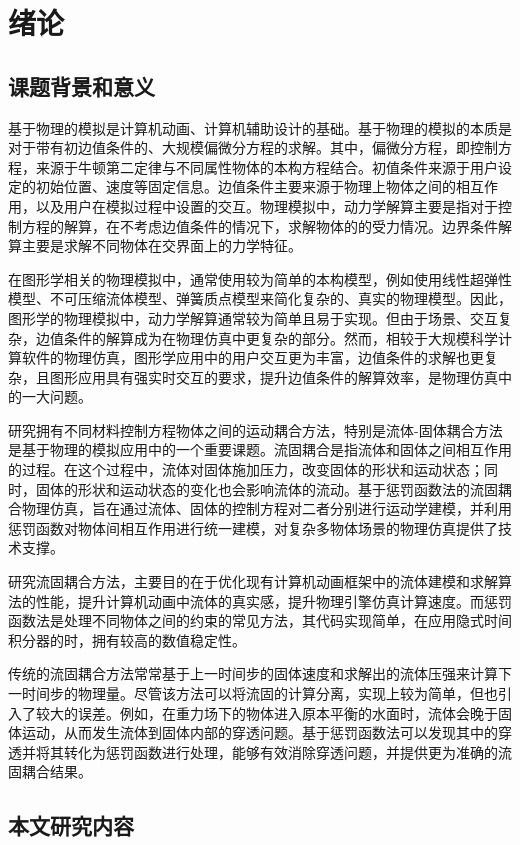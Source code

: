 \chapter{绪论}
\section{课题背景和意义}

基于物理的模拟是计算机动画、计算机辅助设计的基础。基于物理的模拟的本质是对于带有初边值条件的、大规模偏微分方程的求解。其中，偏微分方程，即控制方程，来源于牛顿第二定律与不同属性物体的本构方程结合。初值条件来源于用户设定的初始位置、速度等固定信息。边值条件主要来源于物理上物体之间的相互作用，以及用户在模拟过程中设置的交互。物理模拟中，动力学解算主要是指对于控制方程的解算，在不考虑边值条件的情况下，求解物体的的受力情况。边界条件解算主要是求解不同物体在交界面上的力学特征。

在图形学相关的物理模拟中，通常使用较为简单的本构模型，例如使用线性超弹性模型、不可压缩流体模型、弹簧质点模型来简化复杂的、真实的物理模型。因此，图形学的物理模拟中，动力学解算通常较为简单且易于实现。但由于场景、交互复杂，边值条件的解算成为在物理仿真中更复杂的部分。然而，相较于大规模科学计算软件的物理仿真，图形学应用中的用户交互更为丰富，边值条件的求解也更复杂，且图形应用具有强实时交互的要求，提升边值条件的解算效率，是物理仿真中的一大问题。

研究拥有不同材料控制方程物体之间的运动耦合方法，特别是流体-固体耦合方法是基于物理的模拟应用中的一个重要课题。流固耦合是指流体和固体之间相互作用的过程。在这个过程中，流体对固体施加压力，改变固体的形状和运动状态；同时，固体的形状和运动状态的变化也会影响流体的流动。基于惩罚函数法的流固耦合物理仿真，旨在通过流体、固体的控制方程对二者分别进行运动学建模，并利用惩罚函数对物体间相互作用进行统一建模，对复杂多物体场景的物理仿真提供了技术支撑。

研究流固耦合方法，主要目的在于优化现有计算机动画框架中的流体建模和求解算法的性能，提升计算机动画中流体的真实感，提升物理引擎仿真计算速度。而惩罚函数法是处理不同物体之间的约束的常见方法，其代码实现简单，在应用隐式时间积分器的时，拥有较高的数值稳定性。

传统的流固耦合方法常常基于上一时间步的固体速度和求解出的流体压强来计算下一时间步的物理量。尽管该方法可以将流固的计算分离，实现上较为简单，但也引入了较大的误差。例如，在重力场下的物体进入原本平衡的水面时，流体会晚于固体运动，从而发生流体到固体内部的穿透问题。基于惩罚函数法可以发现其中的穿透并将其转化为惩罚函数进行处理，能够有效消除穿透问题，并提供更为准确的流固耦合结果。

\section{本文研究内容}

